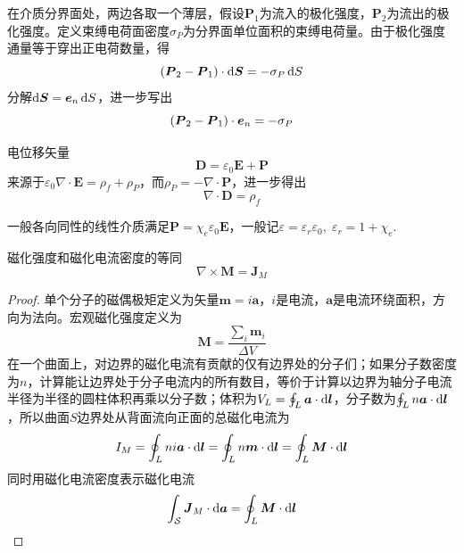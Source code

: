 \documentclass{mynote}
\begin{document}
\begin{proposition}
    在介质分界面处，两边各取一个薄层，假设$\bm{P}_1$为流入的极化强度，$\bm{P}_2$为流出的极化强度。定义束缚电荷面密度$\sigma_P$为分界面单位面积的束缚电荷量。由于极化强度通量等于穿出正电荷数量，得
    \[
    (\boldsymbol{P}_2 - \boldsymbol{P}_1) \cdot \mathop{}\!\mathrm{d} \boldsymbol{S} = - \sigma_P \mathop{}\!\mathrm{d} S    
    \]
    分解$\mathop{}\!\mathrm{d} \boldsymbol{S} = \boldsymbol{e}_n \mathop{}\!\mathrm{d} S$，进一步写出
    \[
        (\boldsymbol{P}_2 - \boldsymbol{P}_1) \cdot \boldsymbol{e}_n = -\sigma_P
    \]
\end{proposition}



\begin{define}{电位移矢量}
    \[
    \boxed{
        \bm{D} = \varepsilon_0 \bm{E} + \bm{P}
    }    
    \]
    来源于$\varepsilon_0 \nabla \cdot \bm{E} = \rho_f + \rho_P$，而$\rho_P = -\nabla \cdot \bm{P}$，进一步得出
    \[
    \boxed{
        \nabla \cdot \bm{D} = \rho_f
    }    
    \]
\end{define}



\begin{proposition}
    一般各向同性的线性介质满足$\bm{P} = \chi_e \varepsilon_0 \bm{E}$，一般记$\varepsilon = \varepsilon_r \varepsilon_0 ,\; \varepsilon_r = 1+\chi_e$.
\end{proposition}







\begin{theorem}{磁化强度和磁化电流密度的等同}
    \[
        \nabla \times \bm{M} = \bm{J}_M
    \]
\end{theorem}
\begin{proof}
    单个分子的磁偶极矩定义为矢量$\bm{m} = i\bm{a}$，$i$是电流，$\bm{a}$是电流环绕面积，方向为法向。宏观磁化强度定义为
    \[
    \bm{M} = \dfrac{\sum_i \bm{m}_i}{\Delta V}    
    \]
    在一个曲面上，对边界的磁化电流有贡献的仅有边界处的分子们；如果分子数密度为$n$，计算能让边界处于分子电流内的所有数目，等价于计算以边界为轴分子电流半径为半径的圆柱体积再乘以分子数；体积为$V_L = \oint_L \boldsymbol{a} \cdot \mathop{}\!\mathrm{d} \boldsymbol{l}$，分子数为$\oint_L n \boldsymbol{a} \cdot \mathop{}\!\mathrm{d} \boldsymbol{l}$，所以曲面$S$边界处从背面流向正面的总磁化电流为
    \[
    I_M = \oint_L n i \boldsymbol{a} \cdot \mathop{}\!\mathrm{d} \boldsymbol{l} = \oint_L n\boldsymbol{m} \cdot \mathop{}\!\mathrm{d} \boldsymbol{l} = \oint_L \boldsymbol{M} \cdot \mathop{}\!\mathrm{d} \boldsymbol{l}    
    \]
    同时用磁化电流密度表示磁化电流
    \[
    \int_{\mathcal{S}} \boldsymbol{J}_M \cdot \mathop{}\!\mathrm{d} \boldsymbol{a} =    \oint_L \boldsymbol{M} \cdot \mathop{}\!\mathrm{d} \boldsymbol{l}  
    \]
\end{proof}
\end{document}
